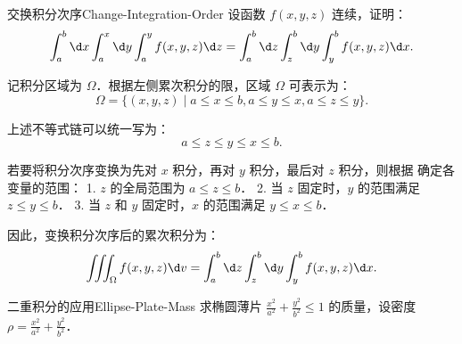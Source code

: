 \begin{problem}{交换积分次序}{Change-Integration-Order}
    设函数 $f(x, y, z)$ 连续，证明：
    \begin{equation}
        \int_a^b \d x \int_a^x \d y \int_a^y f(x, y, z) \d z = \int_a^b \d z \int_z^b \d y \int_y^b f(x, y, z) \d x.
    \end{equation}
\end{problem}

\begin{myproof}
    记积分区域为 $\Omega$．根据左侧累次积分的限，区域 $\Omega$ 可表示为：
    \begin{equation}
        \Omega = \{ (x, y, z) \mid a \le x \le b, a \le y \le x, a \le z \le y \}.
    \end{equation}

    上述不等式链可以统一写为：
    \begin{equation}
        a \le z \le y \le x \le b.
        \label{eq:chain-ineq}
    \end{equation}

    若要将积分次序变换为先对 $x$ 积分，再对 $y$ 积分，最后对 $z$ 积分，则根据  确定各变量的范围：
    1. $z$ 的全局范围为 $a \le z \le b$．
    2. 当 $z$ 固定时，$y$ 的范围满足 $z \le y \le b$．
    3. 当 $z$ 和 $y$ 固定时，$x$ 的范围满足 $y \le x \le b$．

    因此，变换积分次序后的累次积分为：
    \begin{equation}
        \iiint_{\Omega} f(x, y, z) \d v = \int_a^b \d z \int_z^b \d y \int_y^b f(x, y, z) \d x.
    \end{equation}
\end{myproof}

\begin{problem}{二重积分的应用}{Ellipse-Plate-Mass}
    求椭圆薄片 $\frac{x^2}{a^2} + \frac{y^2}{b^2} \leqslant 1$ 的质量，设密度 $\rho = \frac{x^2}{a^2} + \frac{y^2}{b^2}$．
\end{problem}

